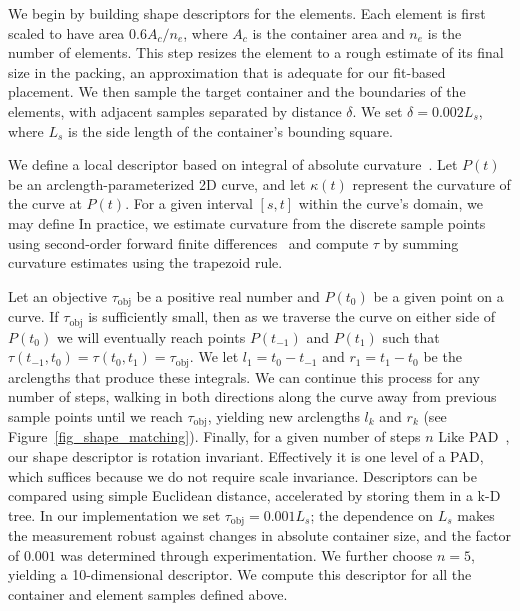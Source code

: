 We begin by building shape descriptors for the elements.  
Each element is first scaled to have area
$0.6A_c/n_e$, where $A_c$ is the container area and $n_e$ is the 
number of elements.  This step resizes the element to a rough estimate
of its final size in the packing, an approximation that is adequate
for our fit-based placement.  We then sample the target container and
the boundaries of the elements, with adjacent samples separated by
distance $\delta$.  We set $\delta=0.002L_s$, where $L_s$ is the
side length of the container's bounding square.

We define a local descriptor based on integral of absolute curvature~\cite{Cui2009,Kwan2016}.
Let $P(t)$ be an arclength-parameterized 2D curve, and let $\kappa(t)$ represent the curvature of the curve at $P(t)$.  For a given interval $[s,t]$ within the curve's domain, we may define 
In practice, we estimate curvature from the discrete sample points
using second-order forward finite differences~\cite{Banchoff2015} 
and compute $\tau$ by summing curvature estimates using the trapezoid rule.

Let an objective $\tau_\mathrm{obj}$ be a positive real number and $P(t_0)$ be a given point on a curve.  If $\tau_\mathrm{obj}$ is sufficiently small, then as we traverse the curve on either side of $P(t_0)$ we will eventually reach points $P(t_{-1})$ and $P(t_1)$ such that $\tau(t_{-1},t_0)=\tau(t_0,t_1)=\tau_\mathrm{obj}$.  We let $l_1=t_0-t_{-1}$ and $r_1=t_1-t_0$ be the arclengths that produce these integrals.  We can continue this process for any number of steps, walking in both directions along the curve away from previous sample points until we reach $\tau_\mathrm{obj}$, yielding new arclengths $l_k$ and $r_k$ (see Figure~\ref{fig_shape_matching}).  Finally, for a given number of steps $n$ 
Like PAD~\cite{Kwan2016}, our shape descriptor is rotation 
invariant.  Effectively it is one level of a PAD, which suffices because
we do not require scale invariance.
Descriptors can be compared using simple Euclidean distance, accelerated
by storing them in a k-D tree.
In our implementation we set $\tau_\mathrm{obj}=0.001L_s$; the dependence
on $L_s$ makes the measurement robust against changes in absolute container
size, and the factor of $0.001$ was determined through experimentation.
We further choose $n=5$, yielding a 10-dimensional descriptor. We compute
this descriptor for all the container and element samples defined above.

